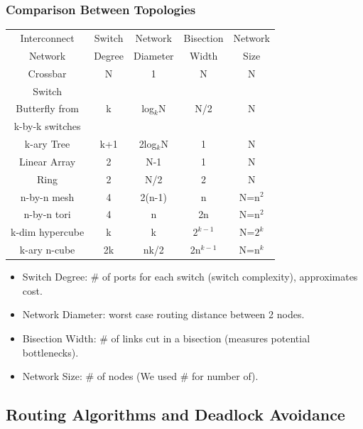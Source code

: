 \documentclass{beamer}
\newcommand{\emp}[1]{\textcolor{DikuRed}{ #1}}
\begin{document}
\begin{frame}[fragile,t]
\frametitle{Comparison Between Topologies}

\begin{tabular}{|c|c|c|c|c|}
\hline
Interconnect    & Switch & Network & Bisection & Network \\
Network         & Degree & Diameter& Width     & Size    \\\hline
Crossbar        & N      & 1       & N         & N       \\
Switch          &        &         &           &         \\\hline
Butterfly from  & k      & log$_k$N& N/2       & N       \\
k-by-k switches &        &         &           &         \\\hline
k-ary Tree      & k+1    &2log$_k$N& 1         & N       \\\hline
Linear Array    & 2      & N-1     & 1         & N       \\\hline
Ring            & 2      & N/2     & 2         & N       \\\hline
n-by-n mesh     & 4      & 2(n-1)  & n         & N=n$^2$ \\\hline
n-by-n tori     & 4      & n       & 2n        & N=n$^2$ \\\hline
k-dim hypercube & k      & k       & $2^{k-1}$ & N=$2^k$ \\\hline
k-ary n-cube    & 2k     & nk/2    & 2n$^{k-1}$  & N=n$^k$  \\\hline\hline
\end{tabular}

\begin{scriptsize}
\begin{itemize}
    \item \emp{Switch Degree:} \# of ports for each switch (switch complexity), \emp{approximates cost}.
    \item \emp{Network Diameter:} worst case routing distance between 2 nodes.
    \item \emp{Bisection Width:} \# of links cut in a bisection (measures potential \emp{bottlenecks}).
    \item \emp{Network Size:} \# of nodes  (We used \# for number of).
\end{itemize}
\end{scriptsize}
\end{frame}

\subsection{Routing Algorithms and Deadlock Avoidance}
\begin{frame}[fragile]
	\tableofcontents[currentsubsection]
\end{frame}
\end{document}

